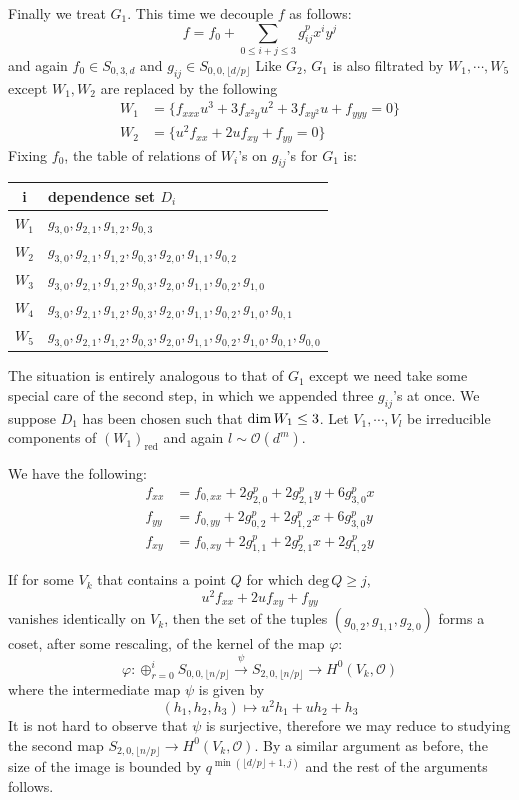 \documentclass[12pt]{article}
\theoremstyle{plain}
\theoremstyle{definition}
\newcommand{\sO}{\mathcal{O}}
\renewcommand{\deg}{\mathrm{deg}\,}
\renewcommand\dim{{\rm dim\,}}
\newcommand{\<}{\langle}
\renewcommand{\>}{\rangle}
\newcommand{\fl}[1]{\lfloor #1 \rfloor}
\begin{document}
Finally we treat $G_1$. This time we decouple $f$ as follows:
$$ f = f_0 + \sum_{0 \le i + j \le 3} g_{ij}^p x^i y^j $$
and again $f_0 \in S_{0, 3, d}$ and $g_{ij} \in S_{0, 0, \fl{d/p}}$
Like $G_2$, $G_1$ is also filtrated by $W_1, \cdots, W_5$ except $W_1, W_2$ are replaced by the following 
\begin{align*}
W_1 &= \{f_{xxx} u^3 + 3 f_{x^2 y} u^2 + 3 f_{x y^2} u + f_{yyy} = 0\}\\
W_2 &= \{u^2 f_{xx} + 2u f_{xy} + f_{yy} = 0\}
\end{align*}
Fixing $f_0$, the table of relations of $W_i$'s on $g_{ij}$'s for $G_1$ is:
\begin{center}
\begin{tabular}{|c | l |}
\hline
i & dependence set $D_i$ \\ \hline
$W_1$ & $g_{3, 0}, g_{2, 1}, g_{1, 2}, g_{0, 3}$ \\ \hline
$W_2$ & $g_{3, 0}, g_{2, 1}, g_{1, 2}, g_{0, 3}, g_{2, 0}, g_{1, 1}, g_{0, 2}$ \\ \hline
$W_3$ & $g_{3, 0}, g_{2, 1}, g_{1, 2}, g_{0, 3}, g_{2, 0}, g_{1, 1}, g_{0, 2}, g_{1, 0}$ \\ \hline
$W_4$ & $g_{3, 0}, g_{2, 1}, g_{1, 2}, g_{0, 3}, g_{2, 0}, g_{1, 1}, g_{0, 2}, g_{1, 0}, g_{0, 1}$ \\ \hline
$W_5$ & $g_{3, 0}, g_{2, 1}, g_{1, 2}, g_{0, 3}, g_{2, 0}, g_{1, 1}, g_{0, 2}, g_{1, 0}, g_{0, 1}, g_{0, 0}$ \\ \hline
\end{tabular}
\end{center}
The situation is entirely analogous to that of $G_1$ except we need take some special care of the second step, in which we appended three $g_{ij}$'s at once. We suppose $D_1$ has been chosen such that $\dim W_1 \le 3$. Let $V_1, \cdots, V_l$ be irreducible components of $(W_1)_{\mathrm{red}}$ and again $l \sim \sO(d^m)$. 

We have the following:
\begin{align*}
f_{xx} &= f_{0, xx} + 2 g_{2, 0}^p + 2g_{2, 1}^p y + 6 g_{3, 0}^p x \\
f_{yy} &= f_{0, yy} + 2 g_{0, 2}^p + 2g_{1, 2}^p x + 6 g_{3, 0}^p y \\
f_{xy} &= f_{0, xy} + 2 g_{1, 1}^p + 2g_{2, 1}^p x + 2 g_{1, 2}^p y
\end{align*}

If for some $V_k$ that contains a point $Q$ for which $\deg Q \ge j$, 
$$ u^2 f_{xx} + 2u f_{xy} + f_{yy} $$
vanishes identically on $V_k$, then the set of the tuples $(g_{0, 2}, g_{1, 1}, g_{2, 0})$ forms a coset, after some rescaling, of the kernel of the map $\varphi$:
$$ \varphi : \oplus_{r=0}^i S_{0, 0, \fl{n/p}} \stackrel{\psi}{\to} S_{2, 0, \fl{n/p}} \to H^0(V_k, \sO) $$
where the intermediate map $\psi$ is given by 
$$ (h_1, h_2, h_3) \mapsto u^2 h_1 + u h_2 + h_3 $$
It is not hard to observe that $\psi$ is surjective, therefore we may reduce to studying the second map $S_{2, 0, \fl{n/p}} \to H^0(V_k, \sO)$. By a similar argument as before, the size of the image is bounded by $q^{\min(\fl{d/p} + 1, j)}$ and the rest of the arguments follows. 
\end{document}
